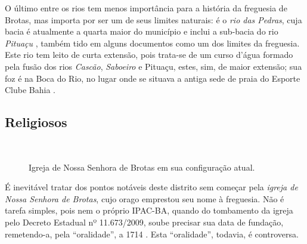 O último entre os rios tem menos importância para a história da freguesia de Brotas, mas importa por ser um de seus limites naturais: é o \textit{rio das Pedras}, cuja bacia é atualmente a quarta maior do município e inclui a sub-bacia do rio \textit{Pituaçu} \cite[p.~175]{santos_aguas_2010}, também tido em alguns documentos como um dos limites da freguesia. Este rio tem leito de curta extensão, pois trata-se de um curso d'água formado pela fusão dos rios \textit{Cascão}, \textit{Saboeiro} e Pituaçu, estes, sim, de maior extensão; sua foz é na Boca do Rio, no lugar onde se situava a antiga sede de praia do Esporte Clube Bahia \cite[p.~175]{santos_aguas_2010}.

\subsection{Religiosos}\label{subsec:pontrel}

\begin{figure}[!htp]
\centering
{}
\  %
\  %
\caption{Igreja de Nossa Senhora de Brotas em sua configuração atual.}
\end{figure}

É inevitável tratar dos pontos notáveis deste distrito sem começar pela \textit{igreja de Nossa Senhora de Brotas}, cujo orago emprestou seu nome à freguesia. Não é tarefa simples, pois nem o próprio IPAC-BA, quando do tombamento da igreja pelo Decreto Estadual nº 11.673/2009, soube precisar sua data de fundação, remetendo-a, pela ``oralidade'', a 1714 \cite{ipac_brotas_2015}. Esta ``oralidade'', todavia, é controversa. 

